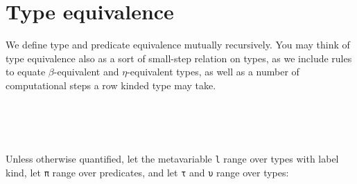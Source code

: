 \documentclass[authoryear, acmsmall, screen, review, nonacm]{acmart}
\begin{document}
\section{Type equivalence}

We define type and predicate equivalence mutually recursively. You may think of type equivalence also as a sort of small-step relation on types, as we include rules to equate $\beta$-equivalent and $\eta$-equivalent types, as well as a number of computational steps a row kinded type may take.

\begin{code}%
\>[0]\AgdaSpace{}%
\AgdaSpace{}%
\<%
\\
\>[0]\AgdaSpace{}%
\AgdaSpace{}%
\<%
\\
\>[0]\AgdaSpace{}%
\AgdaSpace{}%
\AgdaSymbol{:}\AgdaSpace{}%
\AgdaSpace{}%
\AgdaSpace{}%
\AgdaOperator{\AgdaInductiveConstructor{R[}}\AgdaSpace{}%
\AgdaSpace{}%
\AgdaOperator{\AgdaInductiveConstructor{]}}\AgdaSpace{}%
\AgdaSpace{}%
\AgdaSpace{}%
\AgdaSpace{}%
\AgdaOperator{\AgdaInductiveConstructor{R[}}\AgdaSpace{}%
\AgdaSpace{}%
\AgdaOperator{\AgdaInductiveConstructor{]}}\AgdaSpace{}%
\AgdaSpace{}%
\<%
\\
\>[0]\AgdaSpace{}%
\AgdaSpace{}%
\AgdaSymbol{:}\AgdaSpace{}%
\AgdaSpace{}%
\AgdaSpace{}%
\AgdaSpace{}%
\AgdaSpace{}%
\AgdaSpace{}%
\AgdaSpace{}%
\AgdaSpace{}%
\AgdaSpace{}%
\<%
\end{code}

Unless otherwise quantified, let the metavariable \verb!l! range over types with label kind, let \verb!π! range over predicates, and let \verb!τ! and \verb!υ! range over types:
\end{document}
